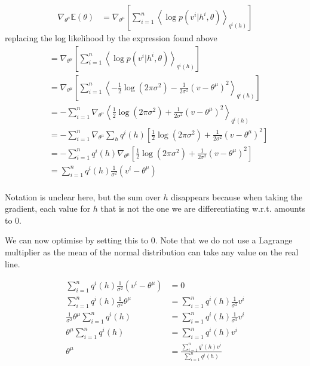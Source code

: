 \documentclass[]{article}
\begin{document}
\begin{align*}
	\nabla_{\theta^{\mu}} \mathbb{E}(\theta) &= \nabla_{\theta^{\mu}}\left[ \sum_{i=1}^{n}  \left\langle \log p(v^i|h^i, \theta) \right\rangle_{q^i(h)} \right]
\end{align*}
replacing the log likelihood by the expression found above
\begin{align*}
	&= \nabla_{\theta^{\mu}}\left[ \sum_{i=1}^{n}  \left\langle \log p(v^i|h^i, \theta) \right\rangle_{q^i(h)} \right] \\
	&= \nabla_{\theta^{\mu}}\left[ \sum_{i=1}^{n}  \left\langle - \frac{1}{2} \log(2\pi\sigma^2)  -\frac{1}{2\sigma^2}(v - \theta^{\mu})^2 \right\rangle_{q^i(h)} \right] \\
	&= - \sum_{i=1}^{n} \nabla_{\theta^{\mu}} \left\langle \frac{1}{2} \log(2\pi\sigma^2)  + \frac{1}{2\sigma^2}(v - \theta^{\mu})^2 \right\rangle_{q^i(h)} \\
	&= - \sum_{i=1}^{n} \nabla_{\theta^{\mu}} \sum_{h} q^i(h) \left[ \frac{1}{2} \log(2\pi\sigma^2)  + \frac{1}{2\sigma^2}(v - \theta^{\mu})^2 \right] \\
	&= - \sum_{i=1}^{n} q^i(h) \nabla_{\theta^{\mu}} \left[ \frac{1}{2} \log(2\pi\sigma^2)  + \frac{1}{2\sigma^2}(v - \theta^{\mu})^2 \right] \\
	&= \sum_{i=1}^{n} q^i(h) \frac{1}{\sigma^2} (v^i - \theta^{\mu})  \\
\end{align*}

Notation is unclear here, but the sum over $h$ disappears because when taking the gradient, each value for $h$ that is not the one we are differentiating w.r.t. amounts to 0. 

We can now optimise by setting this to 0. Note that we do not use a Lagrange multiplier as the mean of the normal distribution can take any value on the real line.

\begin{align*}
	\sum_{i=1}^{n} q^i(h) \frac{1}{\sigma^2} (v^i - \theta^{\mu}) &= 0 \\
	\sum_{i=1}^{n} q^i(h) \frac{1}{\sigma^2}\theta^{\mu} &= \sum_{i=1}^{n} q^i(h) \frac{1}{\sigma^2}v^i \\
	\frac{1}{\sigma^2}\theta^{\mu} \sum_{i=1}^{n} q^i(h) &= \sum_{i=1}^{n} q^i(h) \frac{1}{\sigma^2}v^i \\	
	\theta^{\mu} \sum_{i=1}^{n} q^i(h) &= \sum_{i=1}^{n} q^i(h) v^i \\	
	\theta^{\mu} &= \frac{\sum_{i=1}^{n} q^i(h) v^i}{\sum_{i=1}^{n} q^i(h)} \\
\end{align*}
\end{document}
